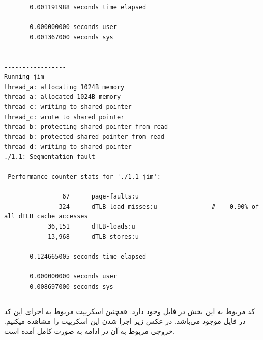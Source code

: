 \documentclass{article}
\begin{document}
\begin{latin}
\begin{lstlisting}
       0.001191988 seconds time elapsed

       0.000000000 seconds user
       0.001367000 seconds sys


-----------------
Running jim
thread_a: allocating 1024B memory
thread_a: allocated 1024B memory
thread_c: writing to shared pointer
thread_c: wrote to shared pointer
thread_b: protecting shared pointer from read
thread_b: protected shared pointer from read
thread_d: writing to shared pointer
./1.1: Segmentation fault

 Performance counter stats for './1.1 jim':

                67      page-faults:u                                                         
               324      dTLB-load-misses:u               #    0.90% of all dTLB cache accesses
            36,151      dTLB-loads:u                                                          
            13,968      dTLB-stores:u                                                         

       0.124665005 seconds time elapsed

       0.000000000 seconds user
       0.008697000 seconds sys
\end{lstlisting}
\end{latin}

\subsubsection{}
\subsubsection{}
\subsubsection{}
\subsection{}
\subsubsection{}
کد مربوط به این بخش در فایل 
وجود دارد. همچنین اسکریپت مربوط به اجرای این کد در فایل 
موجود می‌باشد. در عکس زیر اجرا شدن این اسکریپت را مشاهده میکنیم. خروجی مربوط 
به آن در ادامه به صورت کامل آمده است. 
\end{document}
